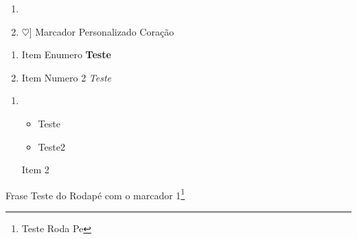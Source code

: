 \documentclass[12pt, a4paper, onside]{article}
\begin{document}
\begin{enumerate}
    \item %
    \item $\heartsuit$] Marcador Personalizado Coração
\end{enumerate}
\begin{enumerate}
    \item Item Enumero \textbf{Teste}
    \item Item Numero 2 \textit{Teste}
\end{enumerate}

\begin{enumerate}
    \item \begin{itemize}
              \item Teste
              \item  Teste2
          \end{itemize}
          Item 2
\end{enumerate}



Frase Teste do Rodapé com o marcador 1\footnote{Teste Roda Pe}



\end{document}
